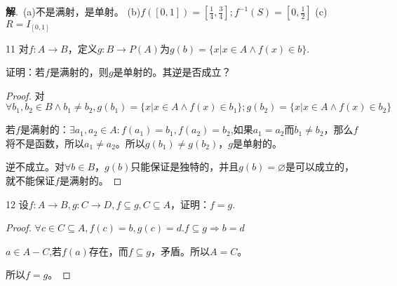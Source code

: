 \documentclass[12pt]{article}
\newenvironment{firstlayer}%
{\begin{list}{}{\renewcommand{\makelabel}[1]{\textbf{##1}.\hfil}
}}
{\end{list}}
\newenvironment{secondlayer}%
{\begin{list}{}{\renewcommand{\makelabel}[1]{(##1)\hfil}
}}
{\end{list}}
\providecommand{\sol}{\textbf{解}.~}
\begin{document}
\begin{CJK}{UTF8}{gbsn}
\begin{firstlayer}
\begin{secondlayer}
    \sol (a)不是满射，是单射。
(b)$f([0,1])=[\frac{1}{4},\frac{3}{4}];f^{-1}(S)=[0,\frac{1}{2}]$
(c)$R=I_{[0,1]}$
\end{secondlayer}
\item[11]对$f:A\rightarrow B$，定义$g:B\rightarrow P(A)$为$g(b)=\{x|x\in A\wedge f(x)\in b\}$.

证明：若$f$是满射的，则$g$是单射的。其逆是否成立？
\begin{proof}
  对$\forall b_1,b_2\in B\wedge b_1\neq b_2,g(b_1)=\{x|x\in A\wedge f(x)\in b_1\};g(b_2)=\{x|x\in A\wedge f(x)\in b_2\}$

若$f$是满射的：$\exists a_1,a_2\in A:f(a_1)=b_1,f(a_2)=b_2$,如果$a_1=a_2$而$b_1\neq b_2$，那么$f$将不是函数，所以$a_1\neq a_2$。所以$g(b_1)\neq g(b_2)$，$g$是单射的。

逆不成立。对$\forall b\in B$，$g(b)$只能保证是独特的，并且$g(b)=\varnothing$是可以成立的，就不能保证$f$是满射的。

\end{proof}

\item[12]设$f:A\rightarrow B,g:C\rightarrow D,f\subseteq g,C\subseteq A$，证明：$f=g$.

\begin{proof}
  $\forall c\in C\subseteq A,f(c)=b,g(c)=d.f\subseteq g\Rightarrow b=d$

$a\in A-C$,若$f(a)$存在，而$f\subseteq g$，矛盾。所以$A=C$。

所以$f=g$。
\end{proof}
\end{firstlayer}

\end{CJK}
\end{document}
